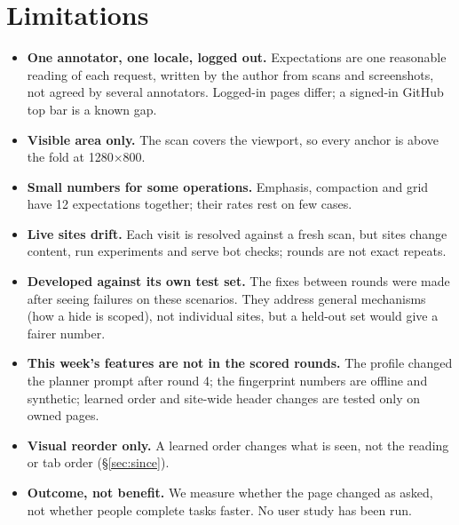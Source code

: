 \documentclass[10pt,a4paper]{article}
\begin{document}
\section{Limitations}
\begin{itemize}
\item \textbf{One annotator, one locale, logged out.} Expectations are one reasonable reading of each request, written by the author from scans and screenshots, not agreed by several annotators. Logged-in pages differ; a signed-in GitHub top bar is a known gap.
\item \textbf{Visible area only.} The scan covers the viewport, so every anchor is above the fold at 1280$\times$800.
\item \textbf{Small numbers for some operations.} Emphasis, compaction and grid have 12 expectations together; their rates rest on few cases.
\item \textbf{Live sites drift.} Each visit is resolved against a fresh scan, but sites change content, run experiments and serve bot checks; rounds are not exact repeats.
\item \textbf{Developed against its own test set.} The fixes between rounds were made after seeing failures on these scenarios. They address general mechanisms (how a hide is scoped), not individual sites, but a held-out set would give a fairer number.
\item \textbf{This week's features are not in the scored rounds.} The profile changed the planner prompt after round 4; the fingerprint numbers are offline and synthetic; learned order and site-wide header changes are tested only on owned pages.
\item \textbf{Visual reorder only.} A learned order changes what is seen, not the reading or tab order (\S\ref{sec:since}).
\item \textbf{Outcome, not benefit.} We measure whether the page changed as asked, not whether people complete tasks faster. No user study has been run.
\end{itemize}
\end{document}

